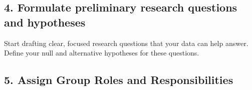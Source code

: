 \documentclass[12pt]{article}
\begin{document}
\vspace{2\baselineskip}

\subsection*{4. Formulate preliminary research questions and hypotheses}
Start drafting clear, focused research questions that your data can help answer.  
Define your null and alternative hypotheses for these questions.

\vspace{3\baselineskip}





\subsection*{5. Assign Group Roles and Responsibilities}
\end{document}
